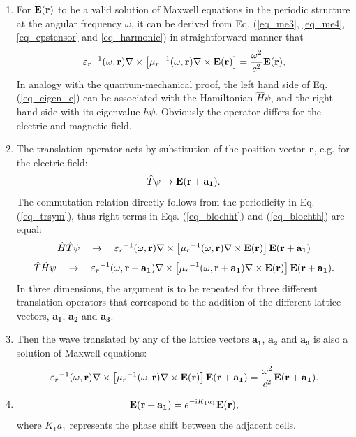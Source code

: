\begin{enumerate}
\item{
For $\mathbf{E}({\mathbf{r}})$ to be a  valid solution of Maxwell equations in the periodic structure at the angular frequency $\omega$,
it can be derived from Eq. (\ref{eq_me3}, \ref{eq_me4}, \ref{eq_epstensor} and \ref{eq_harmonic}) in straightforward manner that
\begin{equation} 
{\varepsilon_r}^{-1}(\omega,{\mathbf{r}}) \nabla\times \left[{\mu_r}^{-1 }(\omega,{\mathbf{r}}) \nabla\times \mathbf{E}({\mathbf{r}}) \right] = \frac{\omega^2}{c^2}\mathbf{E}({\mathbf{r}}),   \label{eq_eigen_e}
\end{equation}
In analogy with the quantum-mechanical proof, the left hand side of Eq. (\ref{eq_eigen_e}) can be associated with the Hamiltonian $\hat H\psi$, and the right hand side with its eigenvalue $h\psi$. Obviously the operator differs for the electric and magnetic field.
} 
\item{
The translation operator acts by substitution of the position vector ${\mathbf{r}}$, e.g. for the electric field:
\begin{equation} \hat T\psi \rightarrow \mathbf{E}({\mathbf{r}}+\mathbf{a_1}). \label{eq_blocht}\end{equation}
The commutation relation directly follows from the periodicity in Eq. (\ref{eq_trsym}), thus right terms in Eqs. (\ref{eq_blochht}) and (\ref{eq_blochth}) are equal:
\begin{equation} \hat H \hat T \psi \quad  \rightarrow \quad  {\varepsilon_r}^{-1}(\omega,{\mathbf{r}}             ) \nabla\times \left[{\mu_r}^{-1 }(\omega,{\mathbf{r}}             ) \nabla\times \mathbf{E}({\mathbf{r}}) \right] \mathbf{E}({\mathbf{r}}+\mathbf{a_1}) \label{eq_blochht}\end{equation}
\begin{equation} \hat T \hat H \psi \quad  \rightarrow \quad  {\varepsilon_r}^{-1}(\omega,{\mathbf{r}}+\mathbf{a_1}) \nabla\times \left[{\mu_r}^{-1 }(\omega,{\mathbf{r}}+\mathbf{a_1}) \nabla\times \mathbf{E}({\mathbf{r}}) \right] \mathbf{E}({\mathbf{r}}+\mathbf{a_1}).  \label{eq_blochth}\end{equation}
In three dimensions, the argument is to be repeated for three different translation operators that correspond to the addition of the different lattice vectors, $\mathbf{a_1}$, $\mathbf{a_2}$ and $\mathbf{a_3}$.
} 
\item{
Then the wave translated by any of the lattice vectors $\mathbf{a_1}$, $\mathbf{a_2}$ and $\mathbf{a_3}$ is also a solution of Maxwell equations:
\begin{equation}  {\varepsilon_r}^{-1}(\omega,{\mathbf{r}}) \nabla\times \left[{\mu_r}^{-1 }(\omega,{\mathbf{r}}) \nabla\times \mathbf{E}({\mathbf{r}}) \right] \mathbf{E}({\mathbf{r}}+\mathbf{a_1}) =  \frac{\omega^2}{c^2}\mathbf{E}({\mathbf{r}}+\mathbf{a_1}).  \label{eq_blochth}\end{equation}
}
\item{
\begin{equation}  \mathbf{E}({\mathbf{r}}+\mathbf{a_1}) = e^{-{\mathrm i} K_1 a_1} \mathbf{E}({\mathbf{r}}),  \label{eq_blochtt}\end{equation}
where $K_1 a_1$ represents the phase shift between the adjacent cells. 
}
 \end{enumerate}
